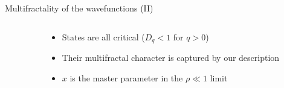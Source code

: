 \documentclass[xcolor=x11names,compress,professionalfonts]{beamer}
\renewcommand{\(}{\begin{columns}}
\renewcommand{\)}{\end{columns}}
\newcommand{\<}[1]{\begin{column}{#1}}
\renewcommand{\>}{\end{column}}
\begin{document}
\begin{frame}{Multifractality of the wavefunctions (II)}
\begin{columns}
	\begin{column}{5cm}
		\centering
	\end{column}
	\begin{column}{5cm}
		\begin{itemize}
			\item States are all critical ($D_{q} < 1$ for $q > 0$)
			\item Their multifractal character is captured by our description
			\item $x$ is the master parameter in the $\rho \ll 1$ limit
		\end{itemize}
	\end{column}
\end{columns}
\end{frame}
\end{document}

